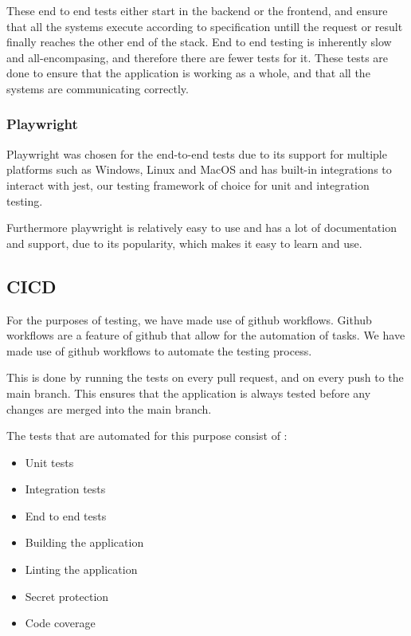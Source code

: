 \documentclass[11pt,a4paper]{article}
\begin{document}
These end to end tests either start in the backend or the frontend, and ensure that all the systems execute according to specification untill the request or result finally reaches the other end of the stack.
End to end testing is inherently slow and all-encompasing, and therefore there are fewer tests for it. These tests are done to ensure that the application is working as a whole, and that all the systems are communicating correctly.


\subsubsection*{Playwright}

Playwright was chosen for the end-to-end tests due to its support for multiple platforms such as Windows, Linux and MacOS and has built-in 
integrations to interact with jest, our testing framework of choice for unit and integration testing. 

Furthermore playwright is relatively easy to use and has a lot of documentation and support,
due to its popularity, which makes it easy to learn and use.

\subsection*{CICD}

For the purposes of testing, we have made use of github workflows. Github workflows are a feature of github that allow for the automation of tasks.
We have made use of github workflows to automate the testing process. 

This is done by running the tests on every pull request, and on every push
to the main branch. This ensures that the application is always tested before any changes are merged into the main branch.

The tests that are automated for this purpose consist of : 
\begin{itemize}
  \item Unit tests
  \item Integration tests
  \item End to end tests
  \item Building the application
  \item Linting the application
  \item Secret protection
  \item Code coverage
\end{itemize}
\end{document}
